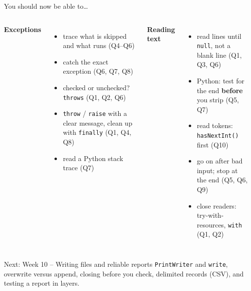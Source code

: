 \documentclass[aspectratio=169]{beamer}
\newcommand{\code}[1]{\texttt{#1}}
\newcommand{\neutrallabel}[1]{\textcolor{bkblue}{\textbf{#1}}}
\newcommand{\yes}{\textcolor{goodgreen}{\ding{51}}}
\begin{document}
\begin{frame}{You should now be able to\ldots}
  \begin{columns}[T,onlytextwidth]
    \neutrallabel{Exceptions}
    \begin{itemize}[itemsep=0.1em]
      \small
      \item[\yes] trace what is skipped and what runs (Q4--Q6)
      \item[\yes] catch the exact exception (Q6, Q7, Q8)
      \item[\yes] checked or unchecked? \code{throws} (Q1, Q2, Q6)
      \item[\yes] \code{throw} / \code{raise} with a clear message, clean up with
            \code{finally} (Q1, Q4, Q8)
      \item[\yes] read a Python stack trace (Q7)
    \end{itemize}
    \neutrallabel{Reading text}
    \begin{itemize}[itemsep=0.1em]
      \small
      \item[\yes] read lines until \code{null}, not a blank line (Q1, Q3, Q6)
      \item[\yes] Python: test for the end \textbf{before} you strip (Q5, Q7)
      \item[\yes] read tokens: \code{hasNextInt()} first (Q10)
      \item[\yes] go on after bad input; stop at the end (Q5, Q6, Q9)
      \item[\yes] close readers: try-with-resources, \code{with} (Q1, Q2)
    \end{itemize}
  \end{columns}
  \begin{contextbox}{Next: Week 10 -- Writing files and reliable reports}
    \footnotesize \code{PrintWriter} and \code{write}, overwrite versus append, closing
    before you check, delimited records (CSV), and testing a report in layers.
  \end{contextbox}
\end{frame}
\end{document}
